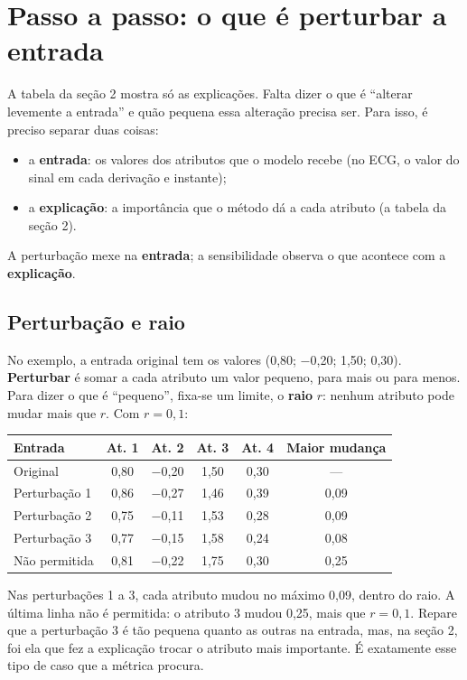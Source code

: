 \documentclass[11pt,a4paper]{article}
\begin{document}
\section{Passo a passo: o que é perturbar a entrada}
A tabela da seção 2 mostra só as explicações. Falta dizer o que é “alterar levemente a entrada” e quão pequena essa alteração precisa ser. Para isso, é preciso separar duas coisas:
\begin{itemize}
\item a \textbf{entrada}: os valores dos atributos que o modelo recebe (no ECG, o valor do sinal em cada derivação e instante);
\item a \textbf{explicação}: a importância que o método dá a cada atributo (a tabela da seção 2).
\end{itemize}
A perturbação mexe na \textbf{entrada}; a sensibilidade observa o que acontece com a \textbf{explicação}.

\subsection{Perturbação e raio}
No exemplo, a entrada original tem os valores (0,80; $-$0,20; 1,50; 0,30). \textbf{Perturbar} é somar a cada atributo um valor pequeno, para mais ou para menos. Para dizer o que é “pequeno”, fixa-se um limite, o \textbf{raio} $r$: nenhum atributo pode mudar mais que $r$. Com $r = 0{,}1$:
\begin{center}\small
\begin{tabular}{lccccc}
\toprule
\textbf{Entrada} & \textbf{At. 1} & \textbf{At. 2} & \textbf{At. 3} & \textbf{At. 4} & \textbf{Maior mudança} \\
\midrule
Original & 0,80 & $-$0,20 & 1,50 & 0,30 & --- \\
Perturbação 1 & 0,86 & $-$0,27 & 1,46 & 0,39 & 0,09 \\
Perturbação 2 & 0,75 & $-$0,11 & 1,53 & 0,28 & 0,09 \\
Perturbação 3 & 0,77 & $-$0,15 & 1,58 & 0,24 & 0,08 \\
\midrule
Não permitida & 0,81 & $-$0,22 & 1,75 & 0,30 & 0,25 \\
\bottomrule
\end{tabular}
\end{center}
Nas perturbações 1 a 3, cada atributo mudou no máximo 0,09, dentro do raio. A última linha não é permitida: o atributo 3 mudou 0,25, mais que $r = 0{,}1$. Repare que a perturbação 3 é tão pequena quanto as outras na entrada, mas, na seção 2, foi ela que fez a explicação trocar o atributo mais importante. É exatamente esse tipo de caso que a métrica procura.
\end{document}
